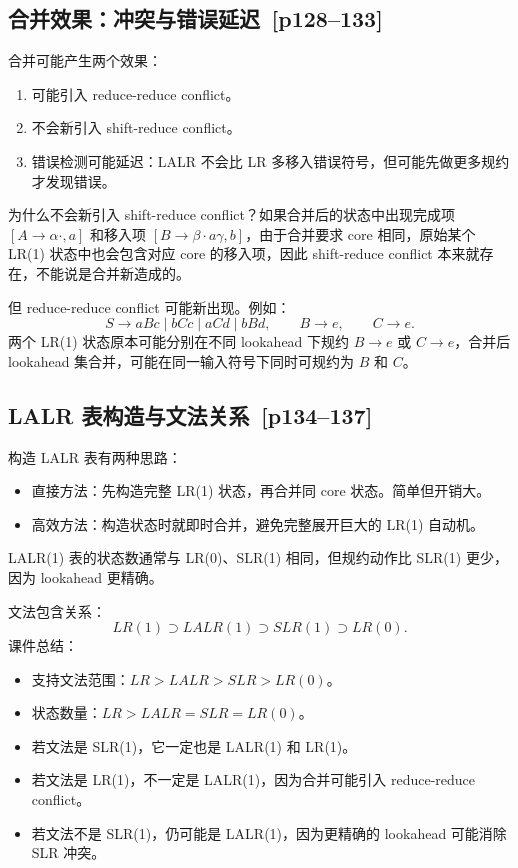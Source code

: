 \documentclass[UTF8,fontset=none,11pt]{ctexart}
\newcommand{\pg}[1]{\texorpdfstring{{\small\color{graytext}\,[p#1]}}{ [p#1]}}
\begin{document}
\subsection{合并效果：冲突与错误延迟 \pg{128--133}}

合并可能产生两个效果：

\begin{enumerate}
  \item 可能引入 reduce-reduce conflict。
  \item 不会新引入 shift-reduce conflict。
  \item 错误检测可能延迟：LALR 不会比 LR 多移入错误符号，但可能先做更多规约才发现错误。
\end{enumerate}

为什么不会新引入 shift-reduce conflict？如果合并后的状态中出现完成项 \([A\to\alpha\cdot,a]\) 和移入项 \([B\to\beta\cdot a\gamma,b]\)，由于合并要求 core 相同，原始某个 LR(1) 状态中也会包含对应 core 的移入项，因此 shift-reduce conflict 本来就存在，不能说是合并新造成的。

但 reduce-reduce conflict 可能新出现。例如：
\[
S\to aBc\mid bCc\mid aCd\mid bBd,\qquad B\to e,\qquad C\to e.
\]
两个 LR(1) 状态原本可能分别在不同 lookahead 下规约 \(B\to e\) 或 \(C\to e\)，合并后 lookahead 集合并，可能在同一输入符号下同时可规约为 \(B\) 和 \(C\)。

\subsection{LALR 表构造与文法关系 \pg{134--137}}

构造 LALR 表有两种思路：

\begin{itemize}
  \item 直接方法：先构造完整 LR(1) 状态，再合并同 core 状态。简单但开销大。
  \item 高效方法：构造状态时就即时合并，避免完整展开巨大的 LR(1) 自动机。
\end{itemize}

LALR(1) 表的状态数通常与 LR(0)、SLR(1) 相同，但规约动作比 SLR(1) 更少，因为 lookahead 更精确。

文法包含关系：
\[
LR(1) \supset LALR(1) \supset SLR(1) \supset LR(0).
\]
课件总结：

\begin{itemize}
  \item 支持文法范围：\(LR > LALR > SLR > LR(0)\)。
  \item 状态数量：\(LR > LALR = SLR = LR(0)\)。
  \item 若文法是 SLR(1)，它一定也是 LALR(1) 和 LR(1)。
  \item 若文法是 LR(1)，不一定是 LALR(1)，因为合并可能引入 reduce-reduce conflict。
  \item 若文法不是 SLR(1)，仍可能是 LALR(1)，因为更精确的 lookahead 可能消除 SLR 冲突。
\end{itemize}
\end{document}
